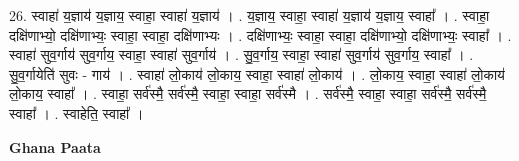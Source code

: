 \documentclass[17pt]{extarticle}
\begin{document}
26. स्वाहा॑ य॒ज्ञाय॑ य॒ज्ञाय॒ स्वाहा॒ स्वाहा॑ य॒ज्ञाय॑ । . य॒ज्ञाय॒ स्वाहा॒ स्वाहा॑ य॒ज्ञाय॑ य॒ज्ञाय॒ स्वाहा᳚ । . स्वाहा॒ दक्षि॑णाभ्यो॒ दक्षि॑णाभ्यः॒ स्वाहा॒ स्वाहा॒ दक्षि॑णाभ्यः । . दक्षि॑णाभ्यः॒ स्वाहा॒ स्वाहा॒ दक्षि॑णाभ्यो॒ दक्षि॑णाभ्यः॒ स्वाहा᳚ । . स्वाहा॑ सुव॒र्गाय॑ सुव॒र्गाय॒ स्वाहा॒ स्वाहा॑ सुव॒र्गाय॑ । . सु॒व॒र्गाय॒ स्वाहा॒ स्वाहा॑ सुव॒र्गाय॑ सुव॒र्गाय॒ स्वाहा᳚ । . सु॒व॒र्गायेति॑ सुवः - गाय॑ । . स्वाहा॑ लो॒काय॑ लो॒काय॒ स्वाहा॒ स्वाहा॑ लो॒काय॑ । . लो॒काय॒ स्वाहा॒ स्वाहा॑ लो॒काय॑ लो॒काय॒ स्वाहा᳚ । . स्वाहा॒ सर्व॑स्मै॒ सर्व॑स्मै॒ स्वाहा॒ स्वाहा॒ सर्व॑स्मै । . सर्व॑स्मै॒ स्वाहा॒ स्वाहा॒ सर्व॑स्मै॒ सर्व॑स्मै॒ स्वाहा᳚ । . स्वाहेति॒ स्वाहा᳚ । \newline

\textbf{Ghana Paata } \newline
\end{document}
